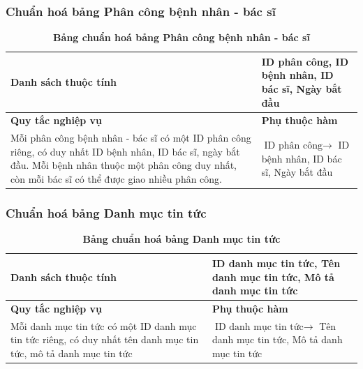 \subsubsection{Chuẩn hoá bảng Phân công bệnh nhân - bác sĩ}
\mbox{}

\begin{table}[H]
  \caption{\bfseries \fontsize{12pt}{0pt}\selectfont Bảng chuẩn hoá bảng Phân công bệnh nhân - bác sĩ}
  \centering
  \begin{tabularx}{0.9\textwidth}{|X|X|}
    \hline
    \textbf{Danh sách thuộc tính} & ID phân công, ID bệnh nhân, ID bác sĩ, Ngày bắt đầu \\
    \hline
    \textbf{Quy tắc nghiệp vụ} & \textbf{Phụ thuộc hàm} \\
    \hline
    Mỗi phân công bệnh nhân - bác sĩ có một ID phân công riêng, có duy nhất ID bệnh nhân, ID bác sĩ, ngày bắt đầu.
    Mỗi bệnh nhân thuộc một phân công duy nhất, còn mỗi bác sĩ có thể được giao nhiều phân công.
    & \parbox[t]{\linewidth}{$\text{ID phân công} \rightarrow$ ID bệnh nhân, ID bác sĩ, Ngày bắt đầu} \\
    \hline
     \\
     \\
    \hline
  \end{tabularx}
\end{table}

\subsubsection{Chuẩn hoá bảng Danh mục tin tức}
\mbox{}

\begin{table}[H]
  \caption{\bfseries \fontsize{12pt}{0pt}\selectfont Bảng chuẩn hoá bảng Danh mục tin tức}
  \centering
  \begin{tabularx}{0.9\textwidth}{|X|X|}
    \hline
    \textbf{Danh sách thuộc tính} & ID danh mục tin tức, Tên danh mục tin tức, Mô tả danh mục tin tức \\
    \hline
    \textbf{Quy tắc nghiệp vụ} & \textbf{Phụ thuộc hàm} \\
    \hline
    Mỗi danh mục tin tức có một ID danh mục tin tức riêng, có duy nhất tên danh mục tin tức, mô tả danh mục tin tức
    & \parbox[t]{\linewidth}{$\text{ID danh mục tin tức} \rightarrow$ Tên danh mục tin tức, Mô tả danh mục tin tức} \\
    \hline
     \\
     \\
    \hline
  \end{tabularx}
\end{table}

